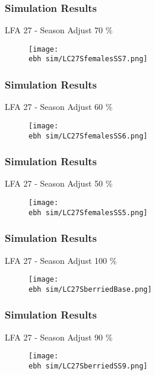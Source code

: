 \documentclass{beamer}
\newcommand{\ebh}{\string~/bio.data/bio.lobster/figures/LFA2733Framework2018/} %
\begin{document}
\begin{frame}
\frametitle{Simulation Results}
LFA 27 - Season Adjust 70 \%
\begin{figure}
        \begin{center}
            \texttt{[image: \\ebh sim/LC27SfemalesSS7.png]}
        \end{center}
    \end{figure}
\end{frame}


\begin{frame}
\frametitle{Simulation Results}
LFA 27 - Season Adjust 60 \%
\begin{figure}
        \begin{center}
            \texttt{[image: \\ebh sim/LC27SfemalesSS6.png]}
        \end{center}
    \end{figure}
\end{frame}


\begin{frame}
\frametitle{Simulation Results}
LFA 27 - Season Adjust 50 \%
\begin{figure}
        \begin{center}
            \texttt{[image: \\ebh sim/LC27SfemalesSS5.png]}
        \end{center}
    \end{figure}
\end{frame}






\begin{frame}
\frametitle{Simulation Results}
LFA 27 - Season Adjust 100 \%
\begin{figure}
        \begin{center}
            \texttt{[image: \\ebh sim/LC27SberriedBase.png]}
        \end{center}
    \end{figure}
\end{frame}


\begin{frame}
\frametitle{Simulation Results}
LFA 27 - Season Adjust 90 \%
\begin{figure}
        \begin{center}
            \texttt{[image: \\ebh sim/LC27SberriedSS9.png]}
        \end{center}
    \end{figure}
\end{frame}
\end{document}
